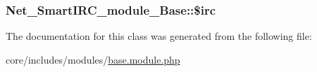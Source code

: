 \subsubsection[{\texorpdfstring{\$irc}{$irc}}]{\setlength{\rightskip}{0pt plus 5cm}Net\+\_\+\+Smart\+I\+R\+C\+\_\+module\+\_\+\+Base\+::\$irc\hspace{0.3cm}{\ttfamily [private]}}\hypertarget{classNet__SmartIRC__module__Base_a8375ade9a962b9e16c8db40c399a1cf1}{}\label{classNet__SmartIRC__module__Base_a8375ade9a962b9e16c8db40c399a1cf1}


The documentation for this class was generated from the following file\+:\begin{DoxyCompactItemize}
\item 
core/includes/modules/\hyperlink{base_8module_8php}{base.\+module.\+php}\end{DoxyCompactItemize}
